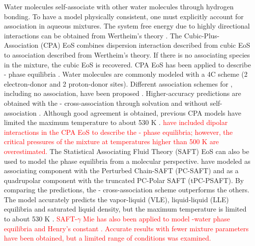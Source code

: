 Water molecules self-associate with other water molecules through hydrogen bonding. To have a model physically consistent, one must explicitly account for association in aqueous mixtures. The system free energy due to highly directional interactions can be obtained from Wertheim's theory \cite{Wertheim1984}. The Cubic-Plus-Association (CPA) EoS \cite{Kontogeorgis1996} combines dispersion interaction described from cubic EoS to association described from Wertheim's theory. If there is no associating species in the mixture, the cubic EoS is recovered. CPA EoS has been applied to describe - phase equilibria \cite{Tsivintzelis2011, Li2009, Pappa2009, Monteiro2020, Perfetti2008}. Water molecules are commonly modeled with a 4C scheme (2 electron-donor and 2 proton-donor sites). Different association schemes for , including no association, have been proposed \cite{Tsivintzelis2011}. Higher-accuracy predictions are obtained with the - cross-association through solvation and without  self-association \cite{Tsivintzelis2011, Li2009, Xiong2023, Bian2019}. Although good agreement is obtained, previous CPA models have limited the maximum temperature to about 530 K \cite{Li2009, Tsivintzelis2011}. \textcolor{red}{\citeauthor{Perfetti2008} \cite{Perfetti2008} have included dipolar interactions in the CPA EoS to describe the - phase equilibria; however, the critical pressures of the mixture at temperatures higher than 500 K are overestimated.} The Statistical Associating Fluid Theory (SAFT) EoS \cite{Chapman1989} can also be used to model the phase equilibria from a molecular perspective. \citeauthor{Diamontonis2012} \cite{Diamontonis2012} have modeled  as associating component with the Perturbed Chain-SAFT (PC-SAFT) and as a quadrupolar component with the truncated PC-Polar SAFT (tPC-PSAFT). By comparing the predictions, the - cross-association scheme outperforms the others. The model accurately predicts the vapor-liquid (VLE), liquid-liquid (LLE) equilibria and saturated liquid density, but the maximum temperature is limited to about 530 K \cite{Diamontonis2012}. \textcolor{red}{SAFT-$\gamma$ Mie has also been applied to model -water phase equilibria and Henry's constant \cite{Papaioannou2016}. Accurate results with fewer mixture parameters have been obtained, but a limited range of conditions was examined.}

